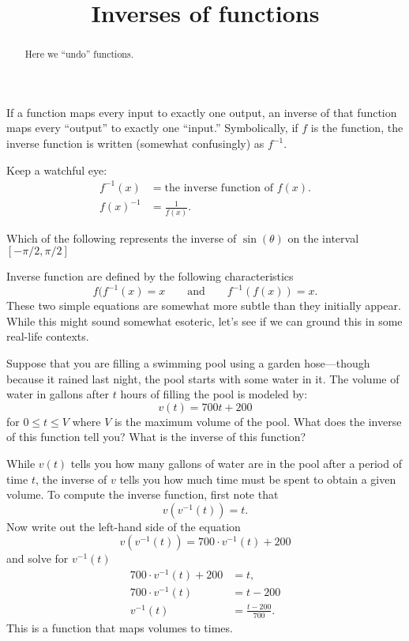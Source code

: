 \documentclass{ximera}
\title{Inverses of functions}
\begin{document}
\begin{abstract}
  Here we ``undo'' functions.
\end{abstract}
\maketitle

If a function maps every input to exactly one output, an inverse of
that function maps every ``output'' to exactly one ``input.''
Symbolically, if $f$ is the function, the inverse function is written
(somewhat confusingly) as $f^{-1}$.

\begin{warning}
  Keep a watchful eye:
  \begin{align*}
    f^{-1}(x) &= \text{the inverse function of $f(x)$.}\\
    f(x)^{-1} &= \text{$\frac{1}{f(x)}$.}
  \end{align*}
\end{warning}
\begin{question}
  Which of the following represents the inverse of $\sin(\theta)$ on the
  interval $[-\pi/2,\pi/2]$
  \begin{multipleChoice}
  \end{multipleChoice}
\end{question}
Inverse function are defined by the following characteristics
\[
f(f^{-1}(x) = x\qquad\text{and}\qquad f^{-1}(f(x)) = x.
\]
These two simple equations are somewhat more subtle than they
initially appear.  While this might sound somewhat esoteric, let's see
if we can ground this in some real-life contexts.

\begin{example}
Suppose that you are filling a swimming pool using a garden
hose---though because it rained last night, the pool starts with some
water in it. The volume of water in gallons after $t$ hours of filling
the pool is modeled by:
\[
v(t) = 700t + 200 
\]
for $0\le t \le V$ where $V$ is the maximum volume of the pool. What
does the inverse of this function tell you? What is the inverse of
this function?
\begin{explanation}
While $v(t)$ tells you how many gallons of water are in the pool after
a period of time $t$, the inverse of $v$ tells you how much time must
be spent to obtain a given volume. To compute the inverse function,
first note that
\[
v(v^{-1}(t)) = t.
\]
Now write out the left-hand side of the equation
\[
v(v^{-1}(t)) = 700\cdot v^{-1}(t) + 200 
\]
and solve for $v^{-1}(t)$
\begin{align*}
  700\cdot v^{-1}(t) + 200 &= t,\\
  700\cdot v^{-1}(t)  &= t-200\\
  v^{-1}(t) &= \frac{t-200}{700}.
\end{align*}
This is a function that maps volumes to times. 
\end{explanation}
\end{example}
\end{document}
